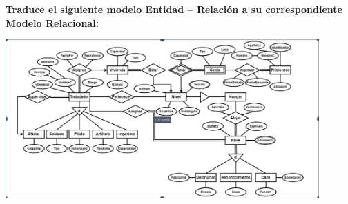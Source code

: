\textbf{Traduce el siguiente modelo Entidad – Relación a su correspondiente Modelo Relacional:}\vspace{.3cm}

\begin{center}
    \includegraphics[width=12cm]{conversion/../resources/a.png}
\end{center}


\vspace{.5cm}